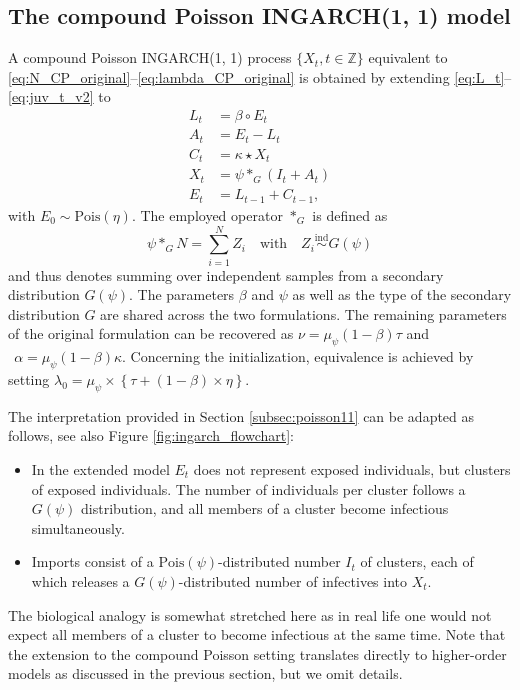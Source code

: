 \documentclass{article}
\begin{document}
\subsection{The compound Poisson INGARCH(1, 1) model}
\label{subsec:compound}

A compound Poisson INGARCH(1, 1) process $\{X_t, t \in \mathbb{Z}\}$ equivalent to \eqref{eq:N_CP_original}--\eqref{eq:lambda_CP_original} is obtained by extending \eqref{eq:L_t}--\eqref{eq:juv_t_v2} to
\begin{align}
L_t & = \beta \circ E_t \label{eq:L_t_CP}\\
A_t & = E_t - L_t \label{eq:A_t_CP}\\
C_t & = \kappa \star X_t \label{eq:C_t_CP}\\
X_t & = \psi *_G (I_t + A_t)\label{eq:X_t_CP} \\
E_t & = L_{t - 1} + C_{t - 1},\label{eq:juv_t_CP}
\end{align}
with $E_0 \sim \text{Pois}(\eta)$. The employed operator $*_G$ is defined as
$$
\psi *_G N = \sum_{i = 1}^N Z_i \ \ \ \text{ with } \ \ \ Z_i \stackrel{\text{ind}}{\sim} G(\psi)
$$
and thus denotes summing over independent samples from a secondary distribution $G(\psi)$. The parameters $\beta$ and $\psi$ as well as the type of the secondary distribution $G$ are shared across the two formulations. The remaining parameters of the original formulation can be recovered as
$
\nu = \mu_\psi(1 - \beta)\tau$ and $ \ \
\alpha = \mu_\psi(1 - \beta)\kappa.
$
Concerning the initialization, equivalence is achieved by setting $\lambda_0 = \mu_\psi\times \left\{\tau + (1 - \beta) \times \eta\right\}$.

The interpretation provided in Section \ref{subsec:poisson11} can be adapted as follows, see also Figure \ref{fig:ingarch_flowchart}:
\begin{itemize}
\item In the extended model $E_t$ does not represent exposed individuals, but clusters of exposed individuals. The number of individuals per cluster follows a $G(\psi)$ distribution, and all members of a cluster become infectious simultaneously.
\item Imports consist of a $\text{Pois}(\psi)$-distributed number $I_t$ of clusters, each of which releases a $G(\psi)$-distributed number of infectives into $X_t$.
\end{itemize}
The biological analogy is somewhat stretched here as in real life one would not expect all members of a cluster to become infectious at the same time. Note that the extension to the compound Poisson setting translates directly to higher-order models as discussed in the previous section, but we omit details.
\end{document}

